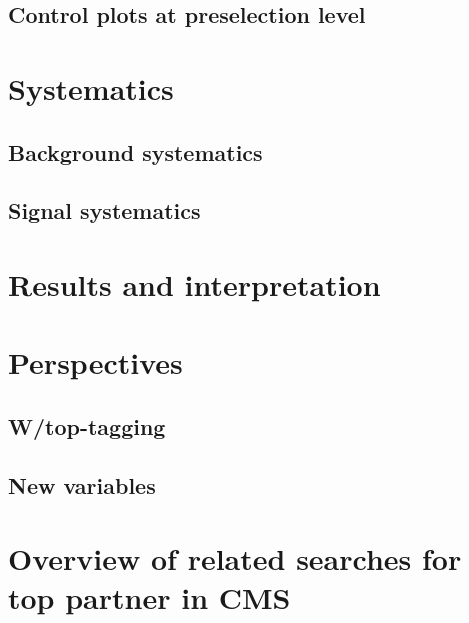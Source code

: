         \subsection{Control plots at preselection level}


    \section{Systematics \label{sec:analysis_systematics}}
        \loremipsum

        \subsection{Background systematics \label{sec:background_systematics}}
        \loremipsum

        \subsection{Signal systematics}
        \loremipsum

    \section{Results and interpretation \label{sec:analysis_results}}
        \loremipsum

    \section{Perspectives \label{sec:analysis_perspective}}
        \loremipsum
        \subsection{W/top-tagging}
        \loremipsum
        \subsection{New variables}
        \loremipsum
    
    \section{Overview of related searches for top partner in CMS \label{sec:analysis_overviewStopSearches}}
        \loremipsum

















